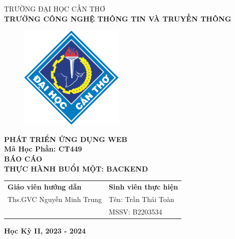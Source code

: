 \documentclass{article}
\begin{document}
\begin{titlepage}
  \begin{center}
    \vspace{-6pt}TRƯỜNG ĐẠI HỌC CẦN THƠ \\
    \textbf{\fontsize{14pt}{0pt}\selectfont TRƯỜNG CÔNG NGHỆ THÔNG TIN VÀ TRUYỀN THÔNG}
    \begin{figure}[H]
      \centering
      \includegraphics[width=5cm]{images/logo-ctu.png}
    \end{figure}
    \textbf{PHÁT TRIỂN ỨNG DỤNG WEB} \\
    \textbf{Mã Học Phần: CT449} \\
    \vspace{4cm}
    \textbf{\fontsize{16pt}{0pt}\selectfont BÁO CÁO} \\
    \textbf{\fontsize{18pt}{0pt}\selectfont THỰC HÀNH BUỔI MỘT: BACKEND} \\
    \vspace{5cm}
    \newcommand{\MyIndent}{\hspace{1cm}}
    \begin{tabular}{p{8cm} l}
      \textbf{Giáo viên hướng dẫn}        & \textbf{Sinh viên thực hiện}  \\
      \MyIndent Ths.GVC Nguyễn Minh Trung & \MyIndent Tên: Trần Thái Toàn \\
                                          & \MyIndent MSSV: B2203534
    \end{tabular}


    \vspace{3cm}
    \textbf{Học Kỳ II, 2023 - 2024} \\
  \end{center}
\end{titlepage}

\begin{titlepage}
\end{titlepage}
\end{document}
